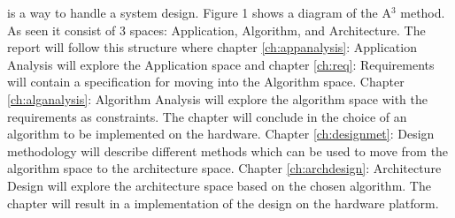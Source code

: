  is a way to handle a system design. Figure 1 shows a diagram of the A$^3$ method.  As seen it consist of 3 spaces: Application, Algorithm, and Architecture. The report will follow this structure where chapter \ref{ch:appanalysis}: Application Analysis will explore the Application space and chapter \ref{ch:req}: Requirements will contain a specification for moving into the Algorithm space. 
Chapter \ref{ch:alganalysis}: Algorithm Analysis will explore the algorithm space with the requirements as constraints. The chapter will conclude in the choice of an algorithm to be implemented on the hardware.
Chapter \ref{ch:designmet}: Design methodology will describe different methods which can be used to move from the algorithm space to the architecture space.
Chapter \ref{ch:archdesign}: Architecture Design will explore the architecture space based on the chosen algorithm. The chapter will result in a implementation of the design on the hardware platform.



